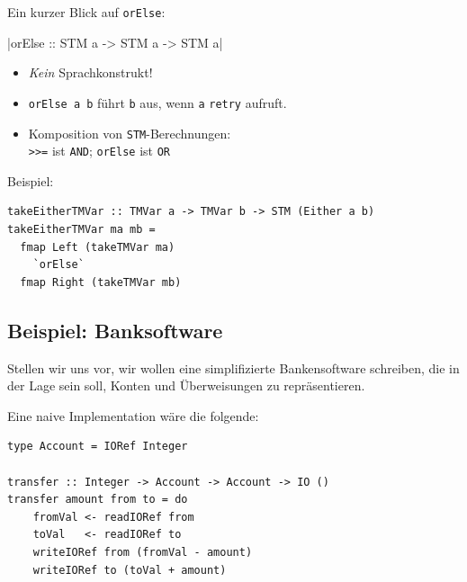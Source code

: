 \documentclass{beamer}
\begin{document}
\begin{frame}[fragile]

Ein kurzer Blick auf \texttt{orElse}:

|orElse :: STM a -> STM a -> STM a|
\pause

\begin{itemize}
\item \emph{Kein} Sprachkonstrukt!\pause
\item \texttt{orElse a b} führt \texttt{b} aus, wenn \texttt{a} \texttt{retry} aufruft.\pause
\item Komposition von \texttt{STM}-Berechnungen:\\
\texttt{>>=} ist \texttt{AND}; \texttt{orElse} ist \texttt{OR}
\end{itemize}
\pause

Beispiel:
\begin{verbatim}
takeEitherTMVar :: TMVar a -> TMVar b -> STM (Either a b)
takeEitherTMVar ma mb =
  fmap Left (takeTMVar ma)
    `orElse`
  fmap Right (takeTMVar mb)
\end{verbatim}
\end{frame}


\subsection{Beispiel: Banksoftware}

\begin{frame}[fragile]

Stellen wir uns vor, wir wollen eine simplifizierte Bankensoftware schreiben, die in der Lage sein soll, Konten und Überweisungen zu repräsentieren.\pause\bigskip

Eine naive Implementation wäre die folgende:

\begin{verbatim}
type Account = IORef Integer
 
transfer :: Integer -> Account -> Account -> IO ()
transfer amount from to = do
    fromVal <- readIORef from
    toVal   <- readIORef to
    writeIORef from (fromVal - amount)
    writeIORef to (toVal + amount)
\end{verbatim}
\end{frame}

\end{document}
